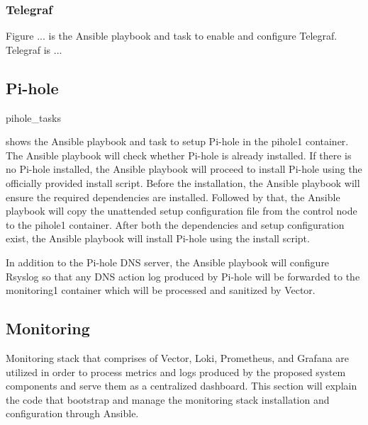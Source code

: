 \documentclass[../index.tex]{subfiles}
\begin{document}
\subsubsection{Telegraf}

Figure ... is the Ansible playbook and task to enable and configure Telegraf. Telegraf is ...

\subsection{Pi-hole}


{pihole_tasks}

 shows the Ansible playbook and task to setup Pi-hole in
the pihole1 container. The Ansible playbook will check whether Pi-hole is already installed. If
there is no Pi-hole installed, the Ansible playbook will proceed to install Pi-hole using the
officially provided install script. Before the installation, the Ansible playbook will ensure the
required dependencies are installed. Followed by that, the Ansible playbook will copy the unattended
setup configuration file from the control node to the pihole1 container. After both the dependencies
and setup configuration exist, the Ansible playbook will install Pi-hole using the install script.

In addition to the Pi-hole DNS server, the Ansible playbook will configure Rsyslog so that any DNS
action log produced by Pi-hole will be forwarded to the monitoring1 container which will be
processed and sanitized by Vector.

\subsection{Monitoring}

Monitoring stack that comprises of Vector, Loki, Prometheus, and Grafana are utilized in order to
process metrics and logs produced by the proposed system components and serve them as a centralized
dashboard. This section will explain the code that bootstrap and manage the monitoring stack
installation and configuration through Ansible.

\end{document}
